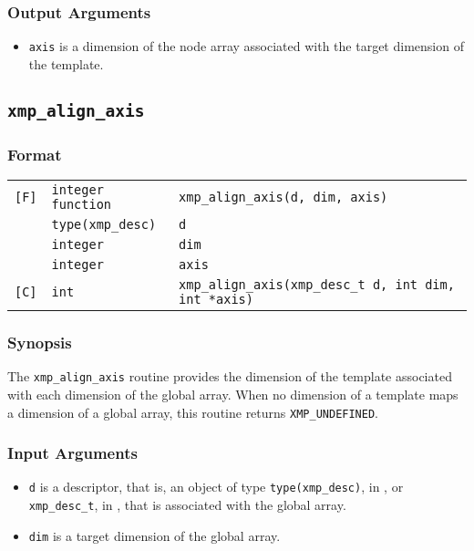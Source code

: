 \subsubsection*{Output Arguments}
\begin{itemize}
 \item {\tt axis} is a dimension of the node array associated with the target dimension of the template.
\end{itemize}


\subsection{\tt xmp\_align\_axis}

\subsubsection*{Format}

\begin{tabular}{lll}

\verb![F]!& {\tt integer function}& {\tt xmp\_align\_axis(d, dim, axis)}\\
          & {\tt type(xmp\_desc)} & {\tt d}\\
          & {\tt integer} & {\tt dim}\\
          & {\tt integer} & {\tt axis}\\

\verb![C]!&  {\tt int}& {\tt xmp\_align\_axis(xmp\_desc\_t d, int dim, int *axis)}\\

\end{tabular}

\subsubsection*{Synopsis}

The {\tt xmp\_align\_axis} routine provides the dimension of the template associated with each dimension of the global array. When no dimension of a template maps a dimension of a global array, this routine returns {\tt XMP\_UNDEFINED}.


\subsubsection*{Input Arguments}
\begin{itemize}
 \item {\tt d} is a descriptor, that is, an object of type 
       {\tt type(xmp\_desc)}, in {\XMPF}, or {\tt xmp\_desc\_t},
       in {\XMPC}, that is associated with the global array.
 \item {\tt dim} is a target dimension of the global array.
\end{itemize}

